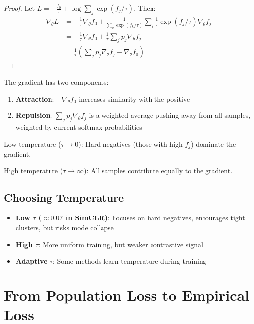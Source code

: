 \begin{notechapter}
\begin{proof}
Let $L = -\frac{f_0}{\tau} + \log \sum_j \exp(f_j/\tau)$. Then:
\begin{align}
\nabla_\theta L &= -\frac{1}{\tau}\nabla_\theta f_0 + \frac{1}{\sum_k \exp(f_k/\tau)} \sum_j \frac{1}{\tau}\exp(f_j/\tau) \nabla_\theta f_j \\
&= -\frac{1}{\tau}\nabla_\theta f_0 + \frac{1}{\tau}\sum_j p_j \nabla_\theta f_j \\
&= \frac{1}{\tau}\left(\sum_j p_j \nabla_\theta f_j - \nabla_\theta f_0\right)
\end{align}
\end{proof}

\begin{intuition}
The gradient has two components:
\begin{enumerate}
    \item \textbf{Attraction}: $-\nabla_\theta f_0$ increases similarity with the positive
    \item \textbf{Repulsion}: $\sum_j p_j \nabla_\theta f_j$ is a weighted average pushing away from all samples, weighted by current softmax probabilities
\end{enumerate}

Low temperature ($\tau \to 0$): Hard negatives (those with high $f_j$) dominate the gradient.

High temperature ($\tau \to \infty$): All samples contribute equally to the gradient.
\end{intuition}

\subsection{Choosing Temperature}

\begin{itemize}
    \item \textbf{Low $\tau$ ($\approx 0.07$ in SimCLR)}: Focuses on hard negatives, encourages tight clusters, but risks mode collapse
    \item \textbf{High $\tau$}: More uniform training, but weaker contrastive signal
    \item \textbf{Adaptive $\tau$}: Some methods learn temperature during training
\end{itemize}

\section{From Population Loss to Empirical Loss}


\end{notechapter}
